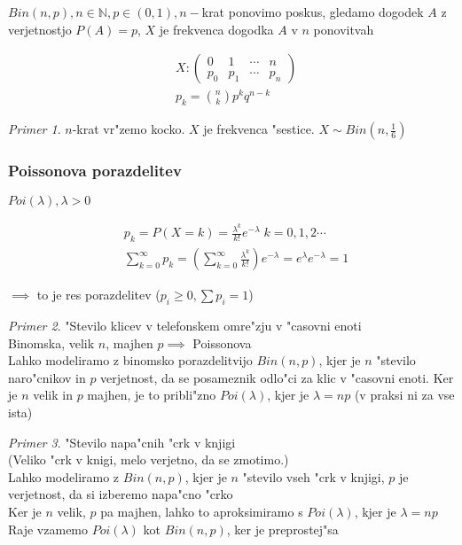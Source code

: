 \documentclass[a4paper,12pt]{article}
\theoremstyle{definition}
\theoremstyle{remark}
\newtheorem*{ex}{Primer}
\newcommand{\N}{\mathbb{N}}
\begin{document}
$Bin(n,p), n \in \N, p \in (0,1), n-$krat ponovimo poskus, gledamo dogodek $A$ z verjetnostjo $P(A) = p$, $X$ je
frekvenca dogodka $A$ v $n$ ponovitvah

\begin{align*}
    &X: \begin{pmatrix}
            0 & 1 & \cdots & n \\
            p_0 & p_1 & \cdots & p_n
        \end{pmatrix} \\
    &p_k = \binom{n}{k} p^k q^{n-k}
\end{align*}

\begin{ex}
    $n$-krat vr"zemo kocko. $X$ je frekvenca "sestice. $X \sim Bin(n, \frac{1}{6})$
\end{ex}





\subsubsection{Poissonova porazdelitev}

$Poi(\lambda), \lambda > 0$

\begin{align*}
    &p_k = P(X = k) = \frac{\lambda^k}{k!} e^{-\lambda} \; k = 0, 1, 2 \cdots \\
    &\sum_{k=0}^{\infty} p_k = (\sum_{k=0}^{\infty} \frac{\lambda^k}{k!}) e^{-\lambda} =
        e^{\lambda} e^{-\lambda} = 1
\end{align*}

$\implies$ to je res porazdelitev ($p_i \geq 0, \sum p_i = 1$)

\begin{ex}
    "Stevilo klicev v telefonskem omre"zju v "casovni enoti \\
    Binomska, velik $n$, majhen $p \implies$ Poissonova \\
    Lahko modeliramo z binomsko porazdelitvijo $Bin(n,p)$, kjer je $n$ "stevilo naro"cnikov in $p$ verjetnost, da se
    posameznik odlo"ci za klic v "casovni enoti. Ker je $n$ velik in $p$ majhen, je to pribli"zno $Poi(\lambda)$, kjer
    je $\lambda = np$ (v praksi ni za vse ista) 
\end{ex}

\begin{ex}
    "Stevilo napa"cnih "crk v knjigi \\
    (Veliko "crk v knigi, melo verjetno, da se zmotimo.) \\
    Lahko modeliramo z $Bin(n,p)$, kjer je $n$ "stevilo vseh "crk v knjigi, $p$ je verjetnost, da si izberemo
    napa"cno "crko \\
    Ker je $n$ velik, $p$ pa majhen, lahko to aproksimiramo s $Poi(\lambda)$, kjer je $\lambda = np$ \\
    Raje vzamemo $Poi(\lambda)$ kot $Bin(n,p)$, ker je preprostej"sa
\end{ex}
\end{document}
